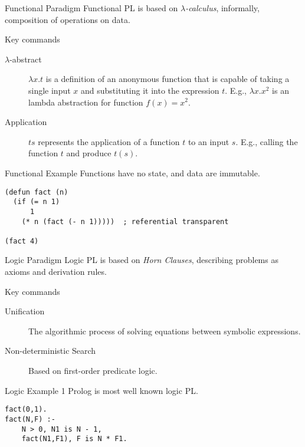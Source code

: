 \documentclass[presentation]{beamer}
\begin{document}
\begin{frame}[label={sec:orgheadline13}]{Functional Paradigm}
Functional PL is based on \emph{\(\lambda\)-calculus}, informally,
composition of operations on data.

Key commands
\begin{description}
\item[{\(\lambda\)-abstract}] \(\lambda x.t\) is a definition of an
anonymous function that is capable of taking a single input
\(x\) and substituting it into the expression \(t\).  E.g.,
\(\lambda x.x^2\) is an lambda abstraction for function \(f(x)
        = x^2\).
\item[{Application}] \(ts\) represents the application of a function
\(t\) to an input \(s\).  E.g., calling the function \(t\) and
produce \(t(s)\).
\end{description}
\end{frame}

\begin{frame}[fragile,label={sec:orgheadline14}]{Functional Example}
 Functions have no state, and data are immutable.

\begin{verbatim}
(defun fact (n)
  (if (= n 1)
      1
    (* n (fact (- n 1)))))  ; referential transparent

(fact 4)
\end{verbatim}
\end{frame}

\begin{frame}[label={sec:orgheadline15}]{Logic Paradigm}
Logic PL is based on \emph{Horn Clauses}, describing problems as axioms
and derivation rules.

Key commands
\begin{description}
\item[{Unification}] The algorithmic process of solving equations
between symbolic expressions.
\item[{Non-deterministic Search}] Based on first-order predicate logic.
\end{description}
\end{frame}

\begin{frame}[fragile,label={sec:orgheadline16}]{Logic Example 1}
 Prolog is most well known logic PL.

\begin{verbatim}
fact(0,1).
fact(N,F) :-
    N > 0, N1 is N - 1,
    fact(N1,F1), F is N * F1.
\end{verbatim}
\end{frame}
\end{document}
